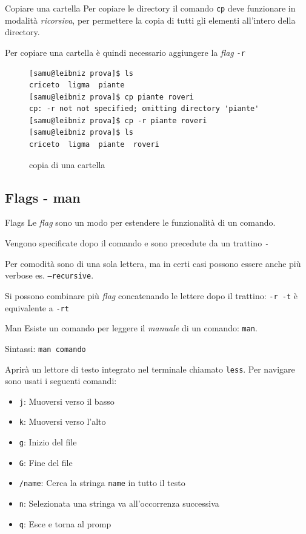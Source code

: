 \documentclass{beamer}
\begin{document}
\begin{frame}[fragile]{Copiare una cartella}
  Per copiare le directory il comando \texttt{cp} deve funzionare in modalità 
  \textit{ricorsiva}, per permettere la copia di tutti gli elementi all'intero
  della directory.\bigskip

  Per copiare una cartella è quindi necessario aggiungere la \textit{flag} 
  \texttt{-r}
  \begin{figure}
    \begin{lstlisting}[basicstyle=\footnotesize]
[samu@leibniz prova]$ ls
criceto  ligma  piante
[samu@leibniz prova]$ cp piante roveri
cp: -r not not specified; omitting directory 'piante'
[samu@leibniz prova]$ cp -r piante roveri
[samu@leibniz prova]$ ls
criceto  ligma  piante  roveri
    \end{lstlisting}
    \caption{copia di una cartella}
  \end{figure}
\end{frame}

\subsection{Flags - man}
\begin{frame}{Flags}
  Le \textit{flag} sono un modo per estendere le funzionalità di un 
  comando.\bigskip

  Vengono specificate dopo il comando e sono precedute da un trattino 
  \texttt{-}\bigskip

  Per comodità sono di una sola lettera, ma in certi casi possono essere anche 
  più verbose es. \texttt{--recursive}.\bigskip

  Si possono combinare più \textit{flag} concatenando le lettere dopo il 
  trattino: \texttt{-r -t} è equivalente a \texttt{-rt}
\end{frame}

\begin{frame}{Man}
  Esiste un comando per leggere il \textit{manuale} di un comando: 
  \texttt{man}.\bigskip

  Sintassi: \texttt{man comando}\bigskip

  Aprirà un lettore di testo integrato nel terminale chiamato \texttt{less}. Per 
  navigare sono usati i seguenti comandi:
  \begin{itemize}
    \item \texttt{j}: Muoversi verso il basso
    \item \texttt{k}: Muoversi verso l'alto
    \item \texttt{g}: Inizio del file
    \item \texttt{G}: Fine del file
    \item \texttt{/name}: Cerca la stringa \texttt{name} in tutto il testo
    \item \texttt{n}: Selezionata una stringa va all'occorrenza successiva
    \item \texttt{q}: Esce e torna al promp
  \end{itemize}
\end{frame}
\end{document}
